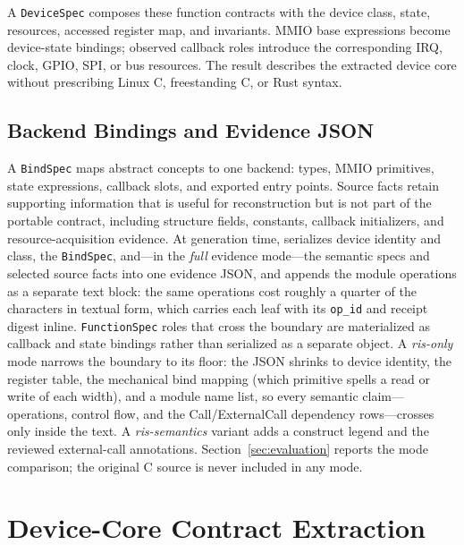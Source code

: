A \texttt{DeviceSpec} composes these function contracts with the device class, state, resources, accessed register map, and invariants. MMIO base expressions become device-state bindings; observed callback roles introduce the corresponding IRQ, clock, GPIO, SPI, or bus resources. The result describes the extracted device core without prescribing Linux C, freestanding C, or Rust syntax.

\subsection{Backend Bindings and Evidence JSON}

A \texttt{BindSpec} maps abstract concepts to one backend: types, MMIO primitives, state expressions, callback slots, and exported entry points. Source facts retain supporting information that is useful for reconstruction but is not part of the portable contract, including structure fields, constants, callback initializers, and resource-acquisition evidence. At generation time, \reharness{} serializes device identity and class, the \texttt{BindSpec}, and---in the \emph{full} evidence mode---the semantic specs and selected source facts into one evidence JSON, and appends the \rislang{} module operations as a separate text block: the same operations cost roughly a quarter of the characters in textual form, which carries each leaf with its \texttt{op\_id} and receipt digest inline. \texttt{FunctionSpec} roles that cross the boundary are materialized as callback and state bindings rather than serialized as a separate object. A \emph{ris-only} mode narrows the boundary to its floor: the JSON shrinks to device identity, the register table, the mechanical bind mapping (which primitive spells a read or write of each width), and a module name list, so every semantic claim---operations, control flow, and the Call/ExternalCall dependency rows---crosses only inside the \rislang{} text. A \emph{ris-semantics} variant adds a construct legend and the reviewed external-call annotations. Section~\ref{sec:evaluation} reports the mode comparison; the original C source is never included in any mode.

\section{Device-Core Contract Extraction}
\label{sec:extraction}

